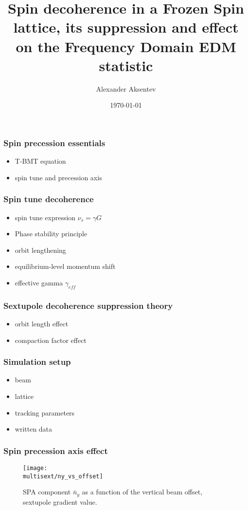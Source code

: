 \documentclass{beamer}
\title{Spin decoherence in a Frozen Spin lattice, its suppression and effect on the Frequency Domain EDM statistic}
\author{Alexander Aksentev}
\date{\today}
\newcommand{\home}{\string~}
\newcommand{\Artem}{\home/REPOS/COSYINF/img/Artem}
\newcommand{\multisext}{\Artem/multisext_test}
\begin{document}
\begin{frame}
  \titlepage
\end{frame}

\begin{frame}\frametitle{Spin precession essentials}
  \begin{itemize}
  \item T-BMT equation
  \item spin tune and precession axis
  \end{itemize}
\end{frame}

\begin{frame}\frametitle{Spin tune decoherence}
  \begin{itemize}
  \item spin tune expression $\nu_s = \gamma G$
  \item Phase stability principle
  \item orbit lengthening
  \item equilibrium-level momentum shift
  \item effective gamma $\gamma_{eff}$
  \end{itemize}
\end{frame}

\begin{frame}\frametitle{Sextupole decoherence suppression theory}
  \begin{itemize}
  \item orbit length effect
  \item compaction factor effect
  \end{itemize}
\end{frame}

\begin{frame}\frametitle{Simulation setup}
  \begin{itemize}
  \item beam
  \item lattice
  \item tracking parameters
  \item written data
  \end{itemize}
\end{frame}

\begin{frame}\frametitle{Spin precession axis effect}
  \begin{figure}[H]
    \centering
    \texttt{[image: \\multisext/ny\_vs\_offset]}
    \caption{SPA component $\bar n_y$ as a function of the vertical beam offset, sextupole gradient value.\label{fig:DECOH_full_ny}}
  \end{figure}
\end{frame}
\end{document}
